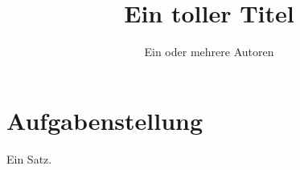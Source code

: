


\frontmatter
\title{Ein toller Titel}
\author{Ein oder mehrere Autoren}
\maketitle
\tableofcontents

\mainmatter
\chapter{Aufgabenstellung}
    \label{sec:aufgabenstellung}
    Ein Satz.
